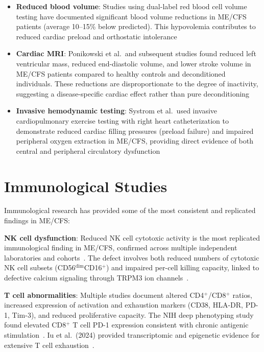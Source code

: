 \begin{itemize}
    \item \textbf{Reduced blood volume}: Studies using dual-label red blood cell volume testing have documented significant blood volume reductions in ME/CFS patients (average 10--15\% below predicted). This hypovolemia contributes to reduced cardiac preload and orthostatic intolerance
    \item \textbf{Cardiac MRI}: Ponikowski et al.\ and subsequent studies found reduced left ventricular mass, reduced end-diastolic volume, and lower stroke volume in ME/CFS patients compared to healthy controls and deconditioned individuals. These reductions are disproportionate to the degree of inactivity, suggesting a disease-specific cardiac effect rather than pure deconditioning
    \item \textbf{Invasive hemodynamic testing}: Systrom et al.\ used invasive cardiopulmonary exercise testing with right heart catheterization to demonstrate reduced cardiac filling pressures (preload failure) and impaired peripheral oxygen extraction in ME/CFS, providing direct evidence of both central and peripheral circulatory dysfunction
\end{itemize}

\section{Immunological Studies}
\label{sec:immunological-studies-research}

Immunological research has provided some of the most consistent and replicated findings in ME/CFS:

\textbf{NK cell dysfunction}: Reduced NK cell cytotoxic activity is the most replicated immunological finding in ME/CFS, confirmed across multiple independent laboratories and cohorts~\cite{Hardcastle2016}. The defect involves both reduced numbers of cytotoxic NK cell subsets (CD56$^{\text{dim}}$CD16$^+$) and impaired per-cell killing capacity, linked to defective calcium signaling through TRPM3 ion channels~\cite{Cabanas2021}.

\textbf{T cell abnormalities}: Multiple studies document altered CD4$^+$/CD8$^+$ ratios, increased expression of activation and exhaustion markers (CD38, HLA-DR, PD-1, Tim-3), and reduced proliferative capacity. The NIH deep phenotyping study found elevated CD8$^+$ T cell PD-1 expression consistent with chronic antigenic stimulation~\cite{walitt2024deep}. Iu et al.\ (2024) provided transcriptomic and epigenetic evidence for extensive T cell exhaustion~\cite{iu2024tcell_exhaustion}.

